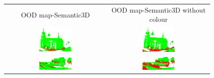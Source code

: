     \begin{figure}[h!]
        \centering
        \begin{tabular}{cc}
            OOD map-Semantic3D & OOD map-Semantic3D without colour \\
            \includegraphics[width=0.33\textwidth, height=0.18\textheight]{images/ood_imgs/sem3d_of/prob/de_sem3d_OOD_1.pdf}&
            \includegraphics[width=0.33\textwidth, height=0.18\textheight]{images/ood_imgs/sem3d_of/prob/de_sem3d_of_OOD_1.pdf}\\

            \includegraphics[width=0.33\textwidth, height=0.18\textheight]{images/ood_imgs/sem3d_of/prob/de_sem3d_OOD_2.pdf}&
            \includegraphics[width=0.33\textwidth, height=0.18\textheight]{images/ood_imgs/sem3d_of/prob/de_sem3d_of_OOD_2.pdf}\\


\end{tabular}
\end{figure}
